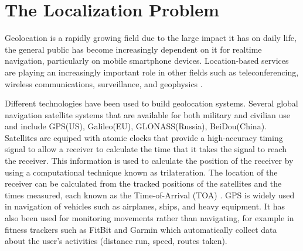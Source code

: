 \label{chapter:introduction}



\section{The Localization Problem} \label{problem}

Geolocation is a rapidly growing field due to the large impact it has on daily life, the general public has become increasingly dependent on it for realtime navigation, particularly on mobile smartphone devices. Location-based services are  playing an increasingly important role in other fields such as teleconferencing, wireless communications, surveillance, and geophysics \cite{Cheung, classMDS, CheungChan, Huang, LiHu,  Sayed,
ShcauRob, SmithAbel,  Yao}.

Different technologies have been used to build geolocation systems. Several global navigation satellite systems that are available for both military and civilian use and include GPS(US), Galileo(EU), GLONASS(Russia), BeiDou(China). Satellites are equiped with atomic clocks that provide a high-accuracy timing signal to  allow a receiver to calculate the time that it takes the signal to reach the receiver. This information is used to calculate the position of the receiver by using a  computational technique known as trilateration. The location of the receiver can be calculated from the
tracked positions of the satellites and the times measured, each known as the Time-of-Arrival (TOA) \cite{GeoLoc}.
%
 GPS is widely used in navigation of vehicles such as airplanes, ships, and heavy equipment. It has also been used for monitoring movements rather than navigating, for example in fitness trackers such as FitBit \cite{FB} and Garmin\cite{Garmin} which automatically collect data about the user's activities (distance run, speed, routes taken).
 

